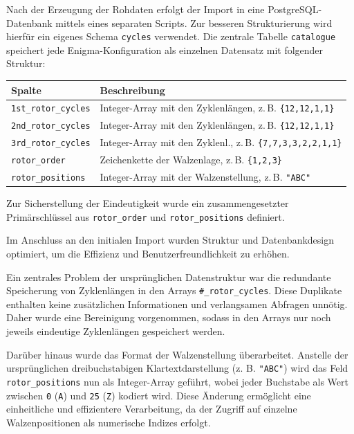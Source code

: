 \documentclass[12pt, ngerman, a4paper, numbers=noenddot]{article}
\begin{document}
Nach der Erzeugung der Rohdaten erfolgt der Import in eine PostgreSQL-Datenbank mittels eines separaten Scripts. Zur besseren Strukturierung wird hierfür ein eigenes Schema \lstinline|cycles| verwendet.  
Die zentrale Tabelle \lstinline|catalogue| speichert jede Enigma-Konfiguration als einzelnen Datensatz mit folgender Struktur:

\begin{center}
	\begin{tabular}{ll}
		\toprule
		\textbf{Spalte} & \textbf{Beschreibung} \\
		\midrule
		\lstinline|1st_rotor_cycles| & Integer-Array mit den Zyklenlängen, z.\,B. \lstinline|{12,12,1,1}| \\
		\lstinline|2nd_rotor_cycles| & Integer-Array mit den Zyklenlängen, z.\,B. \lstinline|{12,12,1,1}| \\
		\lstinline|3rd_rotor_cycles| & Integer-Array mit den Zyklenl., z.\,B. \lstinline|{7,7,3,3,2,2,1,1}| \\
		\lstinline|rotor_order|  & Zeichenkette der Walzenlage, z.\,B. \lstinline|{1,2,3}| \\
		\lstinline|rotor_positions|      & Integer-Array mit der Walzenstellung, z.\,B. \lstinline|"ABC"| \\
		\bottomrule
	\end{tabular}
\end{center}

Zur Sicherstellung der Eindeutigkeit wurde ein zusammengesetzter Primärschlüssel aus \lstinline|rotor_order| und \lstinline|rotor_positions| definiert. 

Im Anschluss an den initialen Import wurden Struktur und Datenbankdesign optimiert, um die Effizienz und Benutzerfreundlichkeit zu erhöhen.

Ein zentrales Problem der ursprünglichen Datenstruktur war die redundante Speicherung von Zyklenlängen in den Arrays \lstinline|#_rotor_cycles|.  
Diese Duplikate enthalten keine zusätzlichen Informationen und verlangsamen Abfragen unnötig. Daher wurde eine Bereinigung vorgenommen, sodass in den Arrays nur noch jeweils eindeutige Zyklenlängen gespeichert werden.


Darüber hinaus wurde das Format der Walzenstellung überarbeitet. Anstelle der ursprünglichen dreibuchstabigen Klartextdarstellung (z. B. \lstinline|"ABC"|) wird das Feld \lstinline|rotor_positions| nun als Integer-Array geführt, wobei jeder Buchstabe als Wert zwischen \lstinline|0| (\lstinline|A|) und \lstinline|25| (\lstinline|Z|) kodiert wird.  
Diese Änderung ermöglicht eine einheitliche und effizientere Verarbeitung, da der Zugriff auf einzelne Walzenpositionen als numerische Indizes erfolgt.
\end{document}

